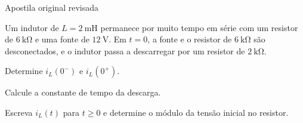 \begin{questao}[3]{Apostila original revisada}

Um indutor de $L=\SI{2}{\milli\henry}$ permanece por muito tempo em série com um
resistor de $\SI{6}{\kilo\ohm}$ e uma fonte de $\SI{12}{\volt}$. Em $t=0$, a fonte
e o resistor de $\SI{6}{\kilo\ohm}$ são desconectados, e o indutor passa a descarregar
por um resistor de $\SI{2}{\kilo\ohm}$.
\begin{itensq}
\item Determine $i_L(0^-)$ e $i_L(0^+)$.
\item Calcule a constante de tempo da descarga.
\item Escreva $i_L(t)$ para $t\ge 0$ e determine o módulo da tensão inicial no resistor.
\end{itensq}


\end{questao}

